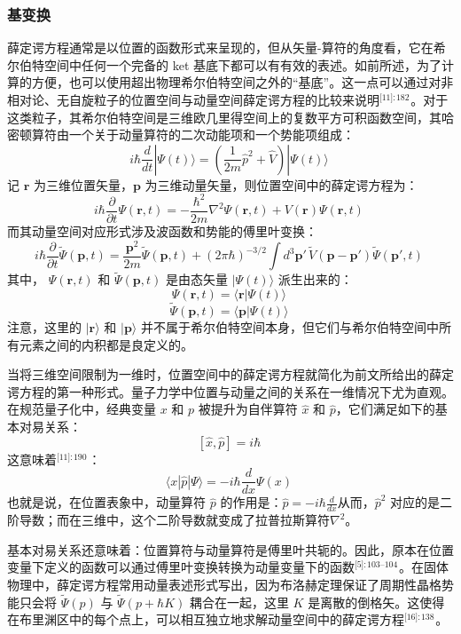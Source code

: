 \subsubsection{基变换}
薛定谔方程通常是以位置的函数形式来呈现的，但从矢量-算符的角度看，它在希尔伯特空间中任何一个完备的 ket 基底下都可以有有效的表述。如前所述，为了计算的方便，也可以使用超出物理希尔伯特空间之外的“基底”。这一点可以通过对非相对论、无自旋粒子的位置空间与动量空间薛定谔方程的比较来说明\(^\text{[11]: 182}\) 。对于这类粒子，其希尔伯特空间是三维欧几里得空间上的复数平方可积函数空间，其哈密顿算符由一个关于动量算符的二次动能项和一个势能项组成：
$$
i\hbar \frac{d}{dt}|\Psi(t)\rangle = \left( \frac{1}{2m} \hat{p}^2 + \hat{V} \right) |\Psi(t)\rangle~
$$
记 $\mathbf{r}$ 为三维位置矢量，$\mathbf{p}$ 为三维动量矢量，则位置空间中的薛定谔方程为：
$$
i\hbar \frac{\partial}{\partial t} \Psi(\mathbf{r}, t) = -\frac{\hbar^2}{2m} \nabla^2 \Psi(\mathbf{r}, t) + V(\mathbf{r}) \Psi(\mathbf{r}, t)~
$$
而其动量空间对应形式涉及波函数和势能的傅里叶变换：
$$
i\hbar \frac{\partial}{\partial t} \tilde{\Psi}(\mathbf{p}, t) = \frac{\mathbf{p}^2}{2m} \tilde{\Psi}(\mathbf{p}, t) + (2\pi\hbar)^{-3/2} \int d^3\mathbf{p}' \, \tilde{V}(\mathbf{p} - \mathbf{p}') \tilde{\Psi}(\mathbf{p}', t)~
$$
其中，
$\Psi(\mathbf{r}, t)$ 和 $\tilde{\Psi}(\mathbf{p}, t)$ 是由态矢量 $|\Psi(t)\rangle$ 派生出来的：
$$
\Psi(\mathbf{r}, t) = \langle \mathbf{r} | \Psi(t) \rangle~
$$
$$
\tilde{\Psi}(\mathbf{p}, t) = \langle \mathbf{p} | \Psi(t) \rangle~
$$
注意，这里的 $|\mathbf{r}\rangle$ 和 $|\mathbf{p}\rangle$ 并不属于希尔伯特空间本身，但它们与希尔伯特空间中所有元素之间的内积都是良定义的。

当将三维空间限制为一维时，位置空间中的薛定谔方程就简化为前文所给出的薛定谔方程的第一种形式。量子力学中位置与动量之间的关系在一维情况下尤为直观。在规范量子化中，经典变量 $x$ 和 $p$ 被提升为自伴算符 $\hat{x}$ 和 $\hat{p}$，它们满足如下的基本对易关系：
$$
[\hat{x}, \hat{p}] = i\hbar~
$$
这意味着\(^\text{[11]: 190 }\)：
$$
\langle x | \hat{p} | \Psi \rangle = -i\hbar \frac{d}{dx} \Psi(x)~
$$
也就是说，在位置表象中，动量算符 $\hat{p}$ 的作用是：$\hat{p} = -i\hbar \frac{d}{dx}$从而，$\hat{p}^2$ 对应的是二阶导数；而在三维中，这个二阶导数就变成了拉普拉斯算符$\nabla^2$。

基本对易关系还意味着：位置算符与动量算符是傅里叶共轭的。因此，原本在位置变量下定义的函数可以通过傅里叶变换转换为动量变量下的函数\(^\text{[5]: 103–104 }\)。在固体物理中，薛定谔方程常用动量表述形式写出，因为布洛赫定理保证了周期性晶格势能只会将 $\tilde{\Psi}(p)$ 与 $\tilde{\Psi}(p + \hbar K)$ 耦合在一起，这里 $K$ 是离散的倒格矢。这使得在布里渊区中的每个点上，可以相互独立地求解动量空间中的薛定谔方程\(^\text{[16]: 138}\) 。
